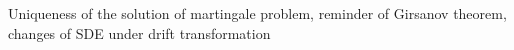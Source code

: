 Uniqueness of the solution of martingale problem, reminder of Girsanov theorem, changes of SDE under drift transformation